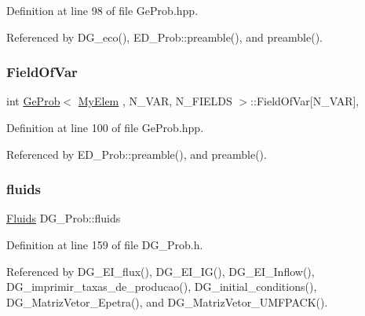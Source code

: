 Definition at line 98 of file Ge\+Prob.\+hpp.



Referenced by D\+G\+\_\+eco(), E\+D\+\_\+\+Prob\+::preamble(), and preamble().

\mbox{\label{classGeProb_a520a47a06c38cfe59938d2bbd65773a2}} 
\subsubsection{\texorpdfstring{Field\+Of\+Var}{FieldOfVar}}
{\footnotesize\ttfamily int \hyperlink{classGeProb}{Ge\+Prob}$<$ \hyperlink{DG__Prob_8h_a83cd887ced9a6587428f267e50cd4787}{My\+Elem} , N\+\_\+\+V\+AR, N\+\_\+\+F\+I\+E\+L\+DS $>$\+::Field\+Of\+Var\mbox{[}N\+\_\+\+V\+AR\mbox{]}\hspace{0.3cm}{\ttfamily [protected]}, {\ttfamily [inherited]}}



Definition at line 100 of file Ge\+Prob.\+hpp.



Referenced by E\+D\+\_\+\+Prob\+::preamble(), and preamble().

\mbox{\label{classDG__Prob_ad296d509627a1a75e0e23c26759f7ef6}} 
\subsubsection{\texorpdfstring{fluids}{fluids}}
{\footnotesize\ttfamily \hyperlink{classFluids}{Fluids} D\+G\+\_\+\+Prob\+::fluids\hspace{0.3cm}{\ttfamily [private]}}



Definition at line 159 of file D\+G\+\_\+\+Prob.\+h.



Referenced by D\+G\+\_\+\+E\+I\+\_\+flux(), D\+G\+\_\+\+E\+I\+\_\+\+I\+G(), D\+G\+\_\+\+E\+I\+\_\+\+Inflow(), D\+G\+\_\+imprimir\+\_\+taxas\+\_\+de\+\_\+producao(), D\+G\+\_\+initial\+\_\+conditions(), D\+G\+\_\+\+Matriz\+Vetor\+\_\+\+Epetra(), and D\+G\+\_\+\+Matriz\+Vetor\+\_\+\+U\+M\+F\+P\+A\+C\+K().

\mbox{\label{classDG__Prob_af218fd61a961903027b7caf7d1157491}} 
